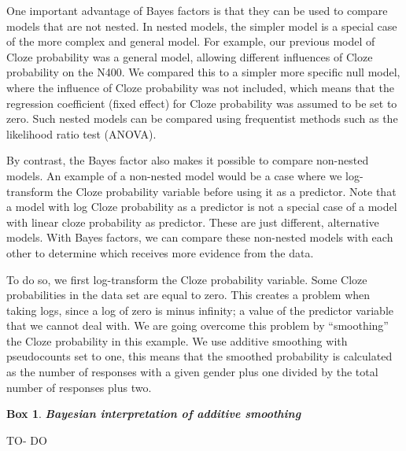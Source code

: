 \documentclass[12pt,]{krantz}
\newenvironment{Shaded}{\begin{snugshade}}{\end{snugshade}}
\newcommand{\KeywordTok}[1]{\textcolor[rgb]{0.13,0.29,0.53}{\textbf{#1}}}
\newcommand{\DataTypeTok}[1]{\textcolor[rgb]{0.13,0.29,0.53}{#1}}
\newcommand{\DecValTok}[1]{\textcolor[rgb]{0.00,0.00,0.81}{#1}}
\newcommand{\StringTok}[1]{\textcolor[rgb]{0.31,0.60,0.02}{#1}}
\newcommand{\OperatorTok}[1]{\textcolor[rgb]{0.81,0.36,0.00}{\textbf{#1}}}
\newcommand{\NormalTok}[1]{#1}
\let\Begin\begin
\let\End\end
\newtheorem{theorem}{Box}[chapter]
\theoremstyle{definition}
\theoremstyle{definition}
\theoremstyle{definition}
\theoremstyle{remark}
\begin{document}
One important advantage of Bayes factors is that they can be used to
compare models that are not nested. In nested models, the simpler model
is a special case of the more complex and general model. For example,
our previous model of Cloze probability was a general model, allowing
different influences of Cloze probability on the N400. We compared this
to a simpler more specific null model, where the influence of Cloze
probability was not included, which means that the regression
coefficient (fixed effect) for Cloze probability was assumed to be set
to zero. Such nested models can be compared using frequentist methods
such as the likelihood ratio test (ANOVA).

By contrast, the Bayes factor also makes it possible to compare
non-nested models. An example of a non-nested model would be a case
where we log-transform the Cloze probability variable before using it as
a predictor. Note that a model with log Cloze probability as a predictor
is not a special case of a model with linear cloze probability as
predictor. These are just different, alternative models. With Bayes
factors, we can compare these non-nested models with each other to
determine which receives more evidence from the data.

To do so, we first log-transform the Cloze probability variable. Some
Cloze probabilities in the data set are equal to zero. This creates a
problem when taking logs, since a log of zero is minus infinity; a value
of the predictor variable that we cannot deal with. We are going
overcome this problem by ``smoothing'' the Cloze probability in this
example. We use additive smoothing \citep[also called Laplace or
Lidstone smoothing;][]{Lidstone1920, ChenGoodman1999} with pseudocounts
set to one, this means that the smoothed probability is calculated as
the number of responses with a given gender plus one divided by the
total number of responses plus two.

\Begin{extra}

\begin{theorem}
\protect\hypertarget{thm:smoothing}{}{\label{thm:smoothing}
}\textbf{Bayesian interpretation of additive smoothing}
\end{theorem}

TO- DO

\End{extra}

\begin{Shaded}
\end{Shaded}
\end{document}
